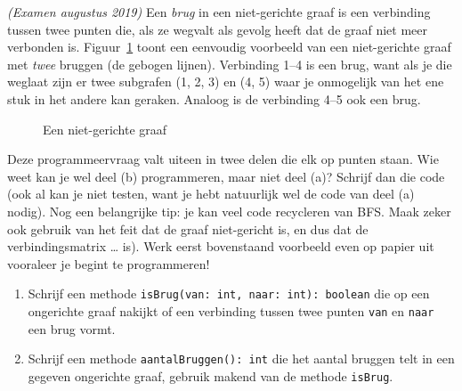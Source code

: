 \begin{oef}
\code \emph{(Examen augustus 2019)} Een \emph{brug} in een niet-gerichte graaf is een verbinding tussen twee punten die, als ze wegvalt als gevolg heeft dat de graaf niet meer verbonden is. Figuur~\ref{fig:graafvb} toont een eenvoudig voorbeeld van een niet-gerichte graaf met \emph{twee} bruggen (de gebogen lijnen). Verbinding 1–4 is een brug, want als je die weglaat zijn er twee subgrafen (1, 2, 3) en (4, 5) waar je onmogelijk van het ene stuk in het andere kan geraken. Analoog is de verbinding 4–5 ook een brug. 
\begin{figure}[htbp]
     \centering
{}
     \caption{Een niet-gerichte graaf}
     \label{fig:graafvb}
\end{figure}

Deze programmeervraag valt uiteen in twee delen die elk op punten staan. Wie weet kan je wel deel (b) programmeren, maar niet deel (a)? Schrijf dan die code (ook al kan je niet testen, want je hebt natuurlijk wel de code van deel (a) nodig). Nog een belangrijke tip: je kan veel code recycleren van BFS. Maak zeker ook gebruik van het feit dat de graaf niet-gericht is, en dus dat de verbindingsmatrix … is). Werk eerst bovenstaand voorbeeld even op papier uit vooraleer je begint te programmeren!
\begin{enumerate}
\item Schrijf een methode \verb+isBrug(van: int, naar: int): boolean+ die op een ongerichte graaf nakijkt of een verbinding tussen twee punten \verb+van+ en \verb+naar+ een brug vormt.
\item Schrijf een methode \verb+aantalBruggen(): int+ die het aantal bruggen telt in een gegeven ongerichte graaf, gebruik makend van de methode \verb+isBrug+.
\end{enumerate}
\begin{opl}

\end{opl}
\end{oef}